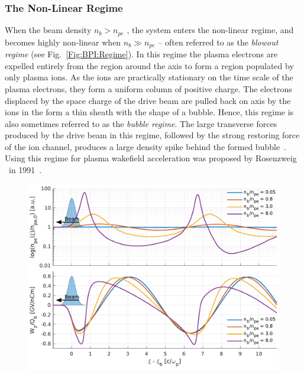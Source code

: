 \subsubsection{The Non-Linear Regime}
\label{Int:BPI:NLin}

When the beam density $n_{b} > n_{pe}$ , the system enters the non-linear regime, and becomes highly non-linear when $n_{b} \gg n_{pe}$ -- often referred to as the \textit{blowout regime} (see Fig.~\ref{Fig:BPI:Regime}). In this regime the plasma electrons are expelled entirely from the region around the axis to form a region populated by only plasma ions. As the ions are practically stationary on the time scale of the plasma electrons, they form a uniform column of positive charge. The electrons displaced by the space charge of the drive beam are pulled back on axis by the ions in the form a thin sheath with the shape of a bubble. Hence, this regime is also sometimes referred to as the \textit{bubble regime}. The large transverse forces produced by the drive beam in this regime, followed by the strong restoring force of the ion channel, produces a large density spike behind the formed bubble~\cite{dawson:1959,rosenzweig:1991}. Using this regime for plasma wakefield acceleration was proposed by Rosenzweig \etal ~in 1991~\cite{rosenzweig:1991}.

\begin{figure}[hbt]
    \centering
    \includegraphics[width=0.875\linewidth,trim={0mm 0mm 0mm 0mm},clip]{figures/Density}
    \caption{\label{Fig:BPI:Density} }
\end{figure}

